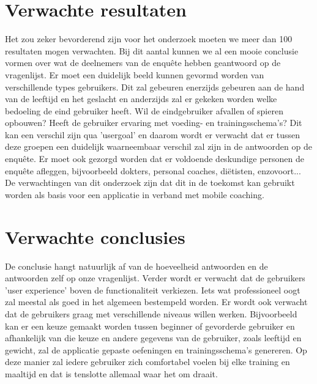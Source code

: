 \section{Verwachte resultaten}
\label{sec:verwachte_resultaten}
Het zou zeker bevorderend zijn voor het onderzoek moeten we meer dan 100 resultaten mogen verwachten. Bij dit aantal kunnen we al een mooie conclusie vormen over wat de deelnemers van de enquête hebben geantwoord op de vragenlijst. \hfill \break \break
Er moet een duidelijk beeld kunnen gevormd worden van verschillende types gebruikers. Dit zal gebeuren enerzijds gebeuren aan de hand van de leeftijd en het geslacht en anderzijds zal er gekeken worden welke bedoeling de eind gebruiker heeft. Wil de eindgebruiker afvallen of spieren opbouwen? Heeft de gebruiker ervaring met voeding- en trainingsschema's? Dit kan een verschil zijn qua 'usergoal' en daarom wordt er verwacht dat er tussen deze groepen een duidelijk waarneembaar verschil zal zijn in de antwoorden op de enquête. Er moet ook gezorgd worden dat er voldoende deskundige personen de enquête afleggen, bijvoorbeeld dokters, personal coaches, diëtisten, enzovoort...\hfill \break \break
De verwachtingen van dit onderzoek zijn dat dit in de toekomst kan gebruikt worden als basis voor een applicatie in verband met mobile coaching. 

\section{Verwachte conclusies}
\label{sec:verwachte_conclusies}
De conclusie hangt natuurlijk af van de hoeveelheid antwoorden en de antwoorden zelf op onze vragenlijst. Verder wordt er verwacht dat de gebruikers 'user experience' boven de functionaliteit verkiezen. Iets wat professioneel oogt zal meestal als goed in het algemeen bestempeld worden. \hfill \break \break Er wordt ook verwacht dat de gebruikers graag met verschillende niveaus willen werken. Bijvoorbeeld kan er een keuze gemaakt worden tussen beginner of gevorderde gebruiker en afhankelijk van die keuze en andere gegevens van de gebruiker, zoals leeftijd en gewicht, zal de applicatie gepaste oefeningen en trainingsschema's genereren. Op deze manier zal iedere gebruiker zich comfortabel voelen bij elke training en maaltijd en dat is tenslotte allemaal waar het om draait.

